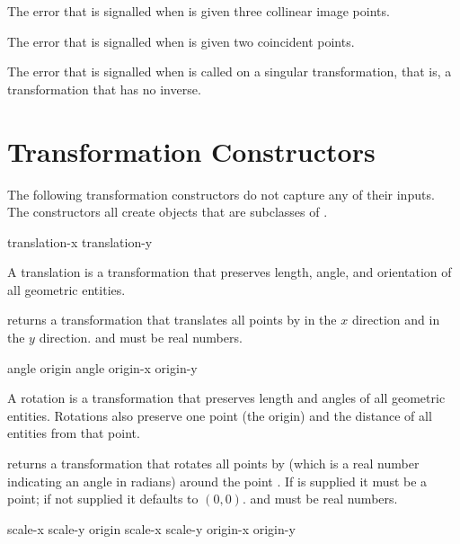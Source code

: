 The error that is signalled when  is given three
collinear image points.


The error that is signalled when  is given
two coincident points.


The error that is signalled when  is called on a
singular transformation, that is, a transformation that has no inverse.


\section {Transformation Constructors}

The following transformation constructors do not capture any of their inputs.
The constructors all create objects that are subclasses of .

 {translation-x translation-y} 

A translation is a transformation that preserves length, angle, and orientation
of all geometric entities.

 returns a transformation that translates
all points by  in the $x$ direction and 
in the $y$ direction.   and  must be real
numbers.


  {angle \optional origin}
 {angle \optional origin-x origin-y}

A rotation is a transformation that preserves length and angles of all geometric
entities.  Rotations also preserve one point (the origin) and the distance of
all entities from that point.

 returns a transformation that rotates all
points by  (which is a real number indicating an angle in radians)
around the point .  If  is supplied it must be a point;
if not supplied it defaults to $(0,0)$.   and  must
be real numbers.

  {scale-x scale-y \optional origin} 
 {scale-x scale-y \optional origin-x origin-y} 

